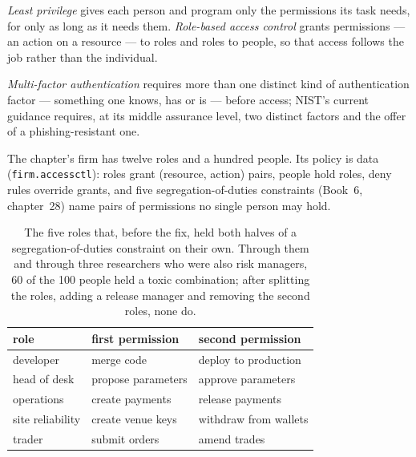 \begin{definition}\label{def:pl:security:rbac}
\emph{Least privilege} gives each person and program only the permissions its task needs, for only as long as it needs
them. \emph{Role-based access control} grants permissions --- an action on a resource --- to roles and roles
to people, so that access follows the job rather than the individual.
\end{definition}

\begin{definition}\label{def:pl:security:mfa}
\emph{Multi-factor authentication} requires more than one distinct kind of authentication factor ---
something one knows, has or is --- before access; NIST's current guidance requires, at its middle assurance level, two distinct factors and
the offer of a phishing-resistant one.
\end{definition}

The chapter's firm has twelve roles and a hundred people. Its policy is data (\texttt{firm.accessctl}): roles grant (resource, action)
pairs, people hold roles, deny rules override grants, and five segregation-of-duties constraints (Book~6, chapter~28) name pairs of
permissions no single person may hold.

\label{lst:pl:security:sod}

\label{lst:pl:security:policy}

\begin{table}[htbp]
\centering\small
\begin{tabular}{lll}
\toprule
role & first permission & second permission\\
\midrule
developer & merge code & deploy to production\\
head of desk & propose parameters & approve parameters\\
operations & create payments & release payments\\
site reliability & create venue keys & withdraw from wallets\\
trader & submit orders & amend trades\\
\bottomrule
\end{tabular}
\caption{The five roles that, before the fix, held both halves of a segregation-of-duties constraint on their own. Through them and through
three researchers who were also risk managers, 60 of the 100 people held a toxic combination; after splitting the roles, adding a release manager and
removing the second roles, none do.}\label{tab:pl:security:toxic}
\end{table}

